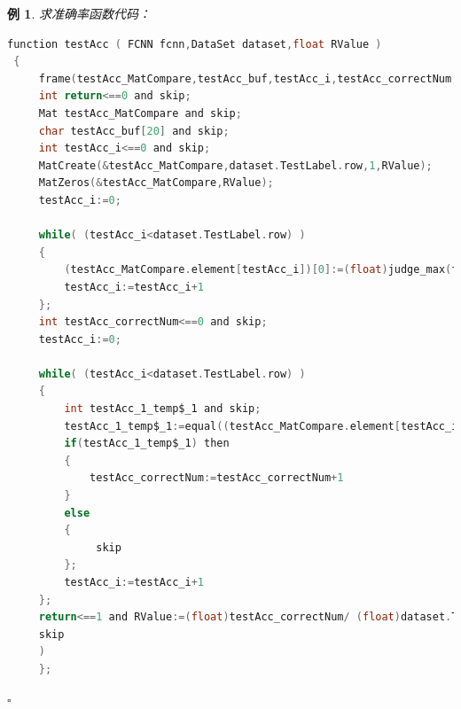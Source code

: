 \documentclass[UTF-8]{progbookcn}
\newtheorem{example}{例}[chapter]         %
\begin{document}
\begin{example}
求准确率函数代码：
\begin{lstlisting}[language=C,caption={函数 2 testAcc}]
function testAcc ( FCNN fcnn,DataSet dataset,float RValue )
 {
     frame(testAcc_MatCompare,testAcc_buf,testAcc_i,testAcc_correctNum,testAcc_1_temp$_1,return) and (
     int return<==0 and skip;
     Mat testAcc_MatCompare and skip;
     char testAcc_buf[20] and skip;
     int testAcc_i<==0 and skip;
     MatCreate(&testAcc_MatCompare,dataset.TestLabel.row,1,RValue);
     MatZeros(&testAcc_MatCompare,RValue);
     testAcc_i:=0;

     while( (testAcc_i<dataset.TestLabel.row) )
     {
         (testAcc_MatCompare.element[testAcc_i])[0]:=(float)judge_max(fcnn.Layer[fcnn.HiddenLayerNum+1].ActiMat.element[testAcc_i],fcnn.Layer[fcnn.HiddenLayerNum+1].ActiMat.col,RValue);       // 求得每个数据概率最大的索引
         testAcc_i:=testAcc_i+1
     };
     int testAcc_correctNum<==0 and skip;
     testAcc_i:=0;

     while( (testAcc_i<dataset.TestLabel.row) )
     {
         int testAcc_1_temp$_1 and skip;
         testAcc_1_temp$_1:=equal((testAcc_MatCompare.element[testAcc_i])[0],(dataset.TestLabel.element[testAcc_i])[0],RValue);     // 与原始标签数据作比较
         if(testAcc_1_temp$_1) then
         {
             testAcc_correctNum:=testAcc_correctNum+1
         }
         else
         {
              skip
         };
         testAcc_i:=testAcc_i+1
     };
     return<==1 and RValue:=(float)testAcc_correctNum/ (float)dataset.TestLabel.row;        // 平均
     skip
     )
     };
\end{lstlisting}
\hfill$\square$\end{example}
\end{document}
